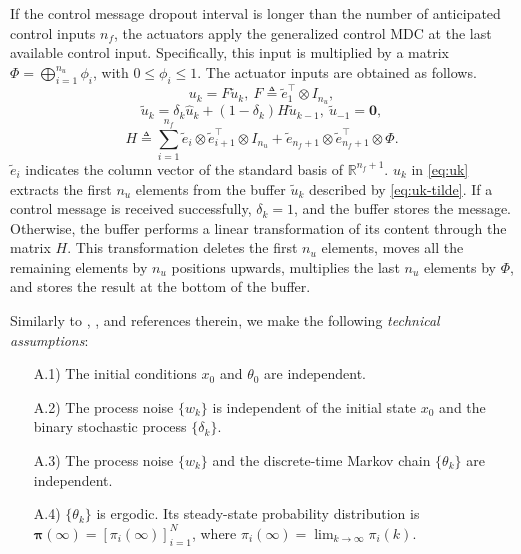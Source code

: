 \documentclass[journal,twoside,web]{ieeecolor}
\begin{document}
If the control message dropout interval is longer than the number of anticipated control inputs $n_f$, the actuators apply the generalized control MDC at the last available control input.  Specifically, this input is multiplied by a matrix $\mathit{\Phi}=\bigoplus_{i=1}^{n_u} \phi_i$, with $0 \leq \phi_i \leq 1$. 
The actuator inputs are obtained as follows.
\begin{equation}\label{eq:uk}
    u_k = F \tilde{u}_k,~F \triangleq \tilde{e}_{1}^{\top} \otimes I_{n_u},
\end{equation}
\begin{equation}\label{eq:uk-tilde}
    \tilde{u}_k = \delta_k \hat{u}_k + \left(1-\delta_k\right) H \tilde{u}_{k-1},~\tilde{u}_{-1} = \mathbf{0},
\end{equation}
\begin{equation}\label{eq:H}
    H \triangleq \sum_{i=1}^{n_f} \tilde{e}_{i} \otimes \tilde{e}_{i+1}^{\top} \otimes I_{n_u} + 
    \tilde{e}_{n_f+1} \otimes \tilde{e}_{n_f+1}^{\top} \otimes \mathit{\Phi}.
\end{equation}
$\tilde{e}_{i}$ indicates the column vector of the standard basis of $\mathbb{R}^{n_f+1}$.
$u_k$ in \eqref{eq:uk} extracts the first $n_u$ elements from the buffer $\tilde{u}_k$ described by \eqref{eq:uk-tilde}.
If a control message is received successfully, $\delta_k = 1$, and the buffer stores the message. Otherwise, the buffer performs a linear transformation of its content through the matrix $H$. This transformation deletes the first $n_u$ elements,  moves all the remaining elements by $n_u$ positions upwards, multiplies the last $n_u$ elements by $\mathit{\Phi}$, and stores the result at the bottom of the buffer.

Similarly to \cite{yZL-2025-automatica}, \cite{impicciatore2024tac}, and references therein, we make the following \emph{technical assumptions}:
\begin{enumerate}
	\item[A.1)] The initial conditions $x_0$ and $\theta_0$ are independent. %
	\item[A.2)] The process noise $\{w_k\}$ is independent of the initial state $x_0$ and the binary stochastic process $\{\delta_k\}$.
	\item[A.3)] The process noise $\{w_k\}$ and the discrete-time Markov chain $\{\theta_k\}$ are independent.
	\item[A.4)] %
    $\{\theta_k\}$ is ergodic. Its steady-state probability distribution is $\bm{\pi}(\infty) = [\pi_{i}(\infty)]_{i=1}^{N}$, where $\pi_{i}(\infty) = \lim_{k\to\infty} \pi_{i}(k)$.
\end{enumerate}
\end{document}
